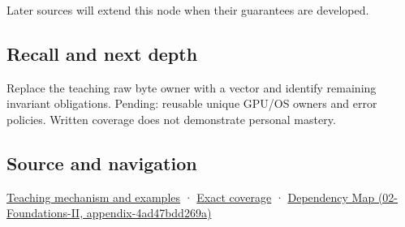 Later sources will extend this node when their guarantees are developed.

\subsection{Recall and next depth}\label{appendix-7679107d057e-recall-and-next-depth}

Replace the teaching raw byte owner with a vector and identify remaining invariant obligations. Pending: reusable unique GPU/OS owners and error policies. Written coverage does not demonstrate personal mastery.

\subsection{Source and navigation}\label{appendix-7679107d057e-source-and-navigation}

\hyperref[01-foundations-i-ch003-from-three-repairs-to-five-decisions-to-zero-boilerplate]{Teaching mechanism and examples} · \hyperref[appendix-fd090d982a15-m009---parts-127-147]{Exact coverage} · \href{../02-Foundations-II/main.pdf\#nameddest=appendix-4ad47bdd269a}{Dependency Map (02-Foundations-II, appendix-4ad47bdd269a)}
